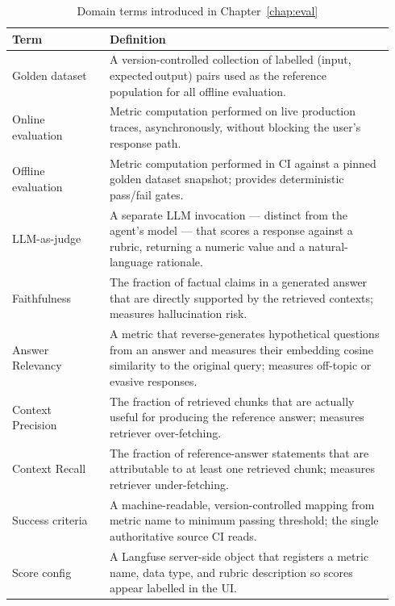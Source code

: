 \begin{table}[ht]
\centering
\caption{Domain terms introduced in Chapter~\ref{chap:eval}}
\label{tab:eval-terms}
\renewcommand{\arraystretch}{1.4}
\begin{tabular}{P{0.24\linewidth} P{0.70\linewidth}}
\toprule
\textbf{Term} & \textbf{Definition} \\
\midrule
Golden dataset
  & A version-controlled collection of labelled (input, expected\,output)
    pairs used as the reference population for all offline evaluation. \\
Online evaluation
  & Metric computation performed on live production traces, asynchronously,
    without blocking the user's response path. \\
Offline evaluation
  & Metric computation performed in CI against a pinned golden dataset
    snapshot; provides deterministic pass/fail gates. \\
LLM-as-judge
  & A separate LLM invocation --- distinct from the agent's model --- that
    scores a response against a rubric, returning a numeric value and
    a natural-language rationale. \\
Faithfulness
  & The fraction of factual claims in a generated answer that are directly
    supported by the retrieved contexts; measures hallucination risk. \\
Answer Relevancy
  & A metric that reverse-generates hypothetical questions from an answer
    and measures their embedding cosine similarity to the original query;
    measures off-topic or evasive responses. \\
Context Precision
  & The fraction of retrieved chunks that are actually useful for producing
    the reference answer; measures retriever over-fetching. \\
Context Recall
  & The fraction of reference-answer statements that are attributable to
    at least one retrieved chunk; measures retriever under-fetching. \\
Success criteria
  & A machine-readable, version-controlled mapping from metric name to
    minimum passing threshold; the single authoritative source CI reads. \\
Score config
  & A Langfuse server-side object that registers a metric name, data type,
    and rubric description so scores appear labelled in the UI. \\
\bottomrule
\end{tabular}
\end{table}

\begin{sourcelayout}
\end{sourcelayout}


